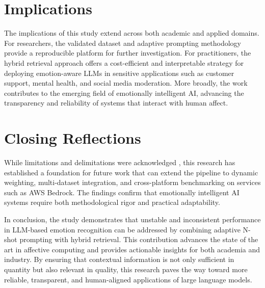 \section{Implications}
The implications of this study extend across both academic and applied domains. For researchers, the validated dataset and adaptive prompting methodology provide a reproducible platform for further investigation. For practitioners, the hybrid retrieval approach offers a cost-efficient and interpretable strategy for deploying emotion-aware LLMs in sensitive applications such as customer support, mental health, and social media moderation. More broadly, the work contributes to the emerging field of emotionally intelligent AI, advancing the transparency and reliability of systems that interact with human affect.

\section{Closing Reflections}
While limitations and delimitations were acknowledged , this research has established a foundation for future work that can extend the pipeline to dynamic weighting, multi-dataset integration, and cross-platform benchmarking on services such as AWS Bedrock. The findings confirm that emotionally intelligent AI systems require both methodological rigor and practical adaptability.  

In conclusion, the study demonstrates that unstable and inconsistent performance in LLM-based emotion recognition can be addressed by combining adaptive N-shot prompting with hybrid retrieval. This contribution advances the state of the art in affective computing and provides actionable insights for both academia and industry. By ensuring that contextual information is not only sufficient in quantity but also relevant in quality, this research paves the way toward more reliable, transparent, and human-aligned applications of large language models.
